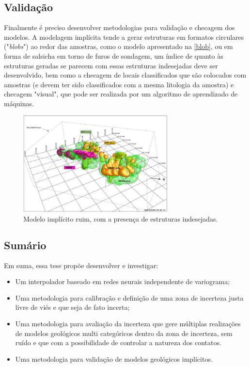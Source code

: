 \subsection{Validação}

Finalmente é preciso desenvolver metodologias para validação e checagem dos modelos. A modelagem implícita tende a gerar estruturas em formatos circulares ("\textit{blobs}") ao redor das amostras, como o modelo apresentado na \autoref{blob}, ou em forma de salsicha em torno de furos de sondagem, um índice de quanto às estruturas geradas se parecem com essas estruturas indesejadas deve ser desenvolvido, bem como a checagem de locais classificados que são colocados com amostras (e devem ter sido classificados com a mesma litologia da amostra) e checagem "visual", que pode ser realizada por um algoritmo de aprendizado de máquinas.

\begin{figure}[H]
	\caption{\label{blob}Modelo implícito ruim, com a presença de estruturas indesejadas.}
	\begin{center}
		\includegraphics[width=0.7\textwidth]{capitulo_3/blob.jpg}
	\end{center}
\end{figure}

\subsection{Sumário}

Em suma, essa tese propõe desenvolver e investigar:

\begin{itemize}
	\item Um interpolador baseado em redes neurais independente de variograma;
	\item Uma metodologia para calibração e definição de uma zona de incerteza justa livre de viés e que seja de fato incerta;
	\item Uma metodologia para avaliação da incerteza que gere múltiplas realizações de modelos geológicos multi categóricos dentro da zona de incerteza, sem ruído e que com a possibilidade de controlar a natureza dos contatos.
	\item Uma metodologia para validação de modelos geológicos implícitos.  
\end{itemize}

